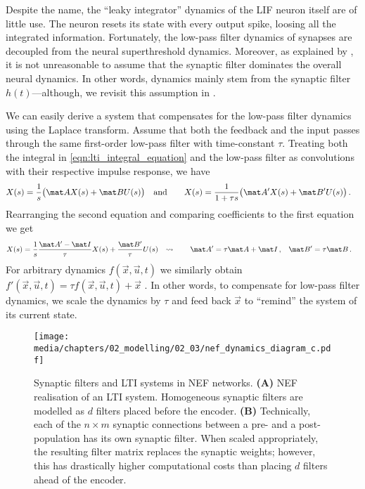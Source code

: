 Despite the name, the \enquote{leaky integrator} dynamics of the LIF neuron itself are of little use.
The neuron resets its state with every output spike, loosing all the integrated information.
Fortunately, the low-pass filter dynamics of synapses are decoupled from the neural superthreshold dynamics.
Moreover, as explained by
\citet[Chapter~8 \& Appendix~F.1]{eliasmith2003neural},
it is not unreasonable to assume that the synaptic filter dominates the overall neural dynamics.
In other words, dynamics mainly stem from the synaptic filter $h(t)$---although, we revisit this assumption in .

We can easily derive a system that compensates for the low-pass filter dynamics using the Laplace transform.
Assume that both the feedback and the input passes through the same first-order low-pass filter with time-constant $\tau$.
Treating both the integral in \cref{eqn:lti_integral_equation} and the low-pass filter as convolutions with their respective impulse response, we have
\begin{align}
	X(s) &= \frac{1}{s} \bigl( \mat A X(s) + \mat B U(s) \bigr) & \text{and} \quad\quad X(s) &= \frac{1}{1 + \tau s} \bigl( \mat A' X(s) + \mat B' U(s) \bigr) \,.
	\label{eqn:original_vs_modified_lti}
\end{align}
Rearranging the second equation and comparing coefficients to the first equation we get
\begin{align*}
	X(s) &= \frac{1}{s} \frac{\mat A' - \mat I}{\tau} X(s) + \frac{\mat B'}{\tau} U(s) &
	\leadsto \quad \quad \mat A' &= \tau \mat A + \mat I \,, &
	\mat B' &= \tau \mat B \,.
\end{align*}
For arbitrary dynamics $f(\vec x, \vec u, t)$ we similarly obtain $f'(\vec x, \vec u, t) = \tau f(\vec x, \vec u, t) + \vec x$ \citep[Chapter~8]{eliasmith2003neural}.
In other words, to compensate for low-pass filter dynamics, we scale the dynamics by $\tau$ and feed back $\vec x$ to \enquote{remind} the system of its current state.

\begin{figure}
	\centering
	\texttt{[image: media/chapters/02\_modelling/02\_03/nef\_dynamics\_diagram\_c.pdf]}%
	{\label{fig:nef_dynamics_neurons_a}}%
	{\label{fig:nef_dynamics_neurons_b}}%
	\caption[Synaptic filters and LTI systems in NEF networks]{Synaptic filters and LTI systems in NEF networks.
	\textbf{(A)} NEF realisation of an LTI system. Homogeneous synaptic filters are modelled as $d$ filters placed before the encoder.
	\textbf{(B)} Technically, each of the $n \times m$ synaptic connections between a pre- and a post-population has its own synaptic filter. When scaled appropriately, the resulting filter matrix replaces the synaptic weights; however, this has drastically higher computational costs than placing $d$ filters ahead of the encoder.}
	\label{fig:nef_dynamics_neurons}
\end{figure}

